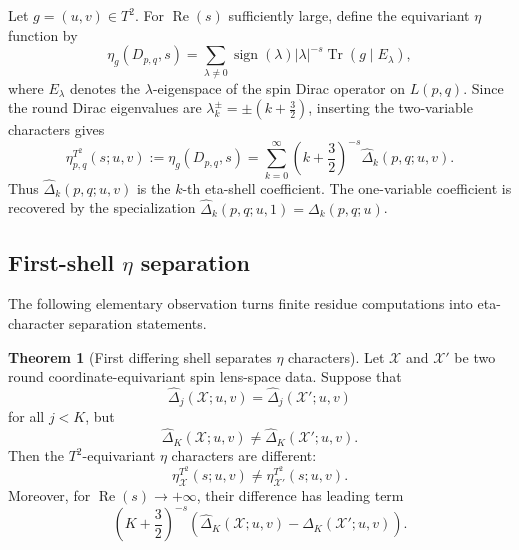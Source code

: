 \documentclass{article}
\theoremstyle{definition}
\newtheorem{theorem}{Theorem}[section]
\numberwithin{equation}{section}
\begin{document}
Let $g=(u,v)\in T^2$.  For $\operatorname{Re}(s)$ sufficiently large, define the equivariant $\eta$ function by
\begin{equation}
\eta_g(D_{p,q},s)
=
\sum_{\lambda\neq 0}
\operatorname{sign}(\lambda)
|\lambda|^{-s}
\operatorname{Tr}\left(g\mid E_\lambda\right),
\end{equation}
where $E_\lambda$ denotes the $\lambda$-eigenspace of the spin Dirac operator on $L(p,q)$.  Since the round Dirac eigenvalues are $\lambda_k^\pm=\pm\left(k+\frac32\right)$, inserting the two-variable characters gives
\begin{equation}
\eta^{T^2}_{p,q}(s;u,v)
:=
\eta_g(D_{p,q},s)
=
\sum_{k=0}^{\infty}
\left(k+\frac32\right)^{-s}
\widehat\Delta_k(p,q;u,v).
\end{equation}
Thus $\widehat\Delta_k(p,q;u,v)$ is the $k$-th eta-shell coefficient.  The one-variable coefficient is recovered by the specialization $\widehat\Delta_k(p,q;u,1)=\Delta_k(p,q;u)$.

\subsection{First-shell $\eta$ separation}

The following elementary observation turns finite residue computations into eta-character separation statements.

\begin{theorem}[First differing shell separates $\eta$ characters]
\label{thm:first-differing-shell-T2}
Let $\mathcal X$ and $\mathcal X'$ be two round coordinate-equivariant spin lens-space data.  Suppose that
\begin{equation}
\widehat\Delta_j(\mathcal X;u,v)
=
\widehat\Delta_j(\mathcal X';u,v)
\end{equation}
for all $j<K$, but
\begin{equation}
\widehat\Delta_K(\mathcal X;u,v)
\neq
\widehat\Delta_K(\mathcal X';u,v).
\end{equation}
Then the $T^2$-equivariant $\eta$ characters are different:
\begin{equation}
\eta^{T^2}_{\mathcal X}(s;u,v)
\neq
\eta^{T^2}_{\mathcal X'}(s;u,v).
\end{equation}
Moreover, for $\operatorname{Re}(s)\to+\infty$, their difference has leading term
\begin{equation}
\left(K+\frac32\right)^{-s}
\left(
\widehat\Delta_K(\mathcal X;u,v)
-
\widehat\Delta_K(\mathcal X';u,v)
\right).
\end{equation}
\end{theorem}
\end{document}

